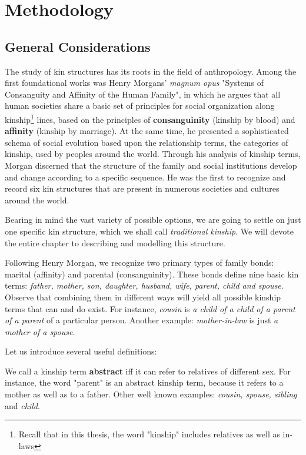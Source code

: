 \chapter{Methodology}
\label{chap:met}

\section{General Considerations}
\label{sec:general}
    The study of kin structures has its roots in the field of anthropology. Among the first foundational works was Henry Morgans'
    \textit{magnum opus} "Systems of Consanguity and Affinity of the Human Family"\cite{morgan}, in which he argues that all human
    societies share a basic set of principles for social organization along kinship\footnote{Recall that in this thesis, the word
    "kinship" includes relatives as well as in-laws} lines, based on the principles of \textbf{consanguinity}
    (kinship by blood) and \textbf{affinity} (kinship by marriage). At the same time, he presented a sophisticated schema of social evolution
    based upon the relationship terms, the categories of kinship, used by peoples around the world. Through his analysis of kinship
    terms, Morgan discerned that the structure of the family and social institutions develop and change according to a specific
    sequence. He was the first to recognize and record six kin structures that are present in numerous societies and cultures around
    the world.

    Bearing in mind the vast variety of possible options, we are going to settle on just one specific kin structure, which we shall
    call \textit{traditional kinship}. We will devote the entire chapter to describing and modelling this structure.

    Following Henry Morgan, we recognize two primary types of family bonds: marital (affinity) and
    parental (consanguinity). These bonds define nine basic kin terms: \textit{father, mother, son, daughter, husband, wife, parent,
    child and spouse}. Observe that combining them in different ways will yield all possible kinship terms that can and do exist.
    For instance, \textit{cousin} is \textit{a child of a child of a parent of a parent} of a particular person. Another example:
    \textit{mother-in-law} is just \textit{a mother of a spouse}.

    Let us introduce several useful definitions:
    \begin{definition}
        We call a kinship term \textbf{abstract} iff it can refer to relatives of different sex. For instance, the word
        "parent" is an abstract kinship term, because it refers to a mother as well as to a father. Other well known examples:
        \textit{cousin, spouse, sibling} and \textit{child}.
    \end{definition}

